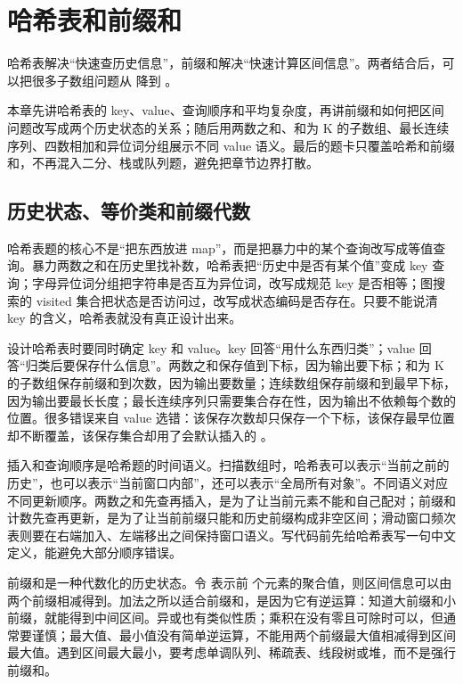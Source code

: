 \chapter{哈希表和前缀和}

哈希表解决“快速查历史信息”，前缀和解决“快速计算区间信息”。两者结合后，可以把很多子数组问题从  降到 。

本章先讲哈希表的 key、value、查询顺序和平均复杂度，再讲前缀和如何把区间问题改写成两个历史状态的关系；随后用两数之和、和为 K 的子数组、最长连续序列、四数相加和异位词分组展示不同 value 语义。最后的题卡只覆盖哈希和前缀和，不再混入二分、栈或队列题，避免把章节边界打散。

\section{历史状态、等价类和前缀代数}

哈希表题的核心不是“把东西放进 map”，而是把暴力中的某个查询改写成等值查询。暴力两数之和在历史里找补数，哈希表把“历史中是否有某个值”变成 key 查询；字母异位词分组把字符串是否互为异位词，改写成规范 key 是否相等；图搜索的 visited 集合把状态是否访问过，改写成状态编码是否存在。只要不能说清 key 的含义，哈希表就没有真正设计出来。

设计哈希表时要同时确定 key 和 value。key 回答“用什么东西归类”；value 回答“归类后要保存什么信息”。两数之和保存值到下标，因为输出要下标；和为 K 的子数组保存前缀和到次数，因为输出要数量；连续数组保存前缀和到最早下标，因为输出要最长长度；最长连续序列只需要集合存在性，因为输出不依赖每个数的位置。很多错误来自 value 选错：该保存次数却只保存一个下标，该保存最早位置却不断覆盖，该保存集合却用了会默认插入的 。

插入和查询顺序是哈希题的时间语义。扫描数组时，哈希表可以表示“当前之前的历史”，也可以表示“当前窗口内部”，还可以表示“全局所有对象”。不同语义对应不同更新顺序。两数之和先查再插入，是为了让当前元素不能和自己配对；前缀和计数先查再更新，是为了让当前前缀只能和历史前缀构成非空区间；滑动窗口频次表则要在右端加入、左端移出之间保持窗口语义。写代码前先给哈希表写一句中文定义，能避免大部分顺序错误。

前缀和是一种代数化的历史状态。令  表示前  个元素的聚合值，则区间信息可以由两个前缀相减得到。加法之所以适合前缀和，是因为它有逆运算：知道大前缀和小前缀，就能得到中间区间。异或也有类似性质；乘积在没有零且可除时可以，但通常要谨慎；最大值、最小值没有简单逆运算，不能用两个前缀最大值相减得到区间最大值。遇到区间最大最小，要考虑单调队列、稀疏表、线段树或堆，而不是强行前缀和。

